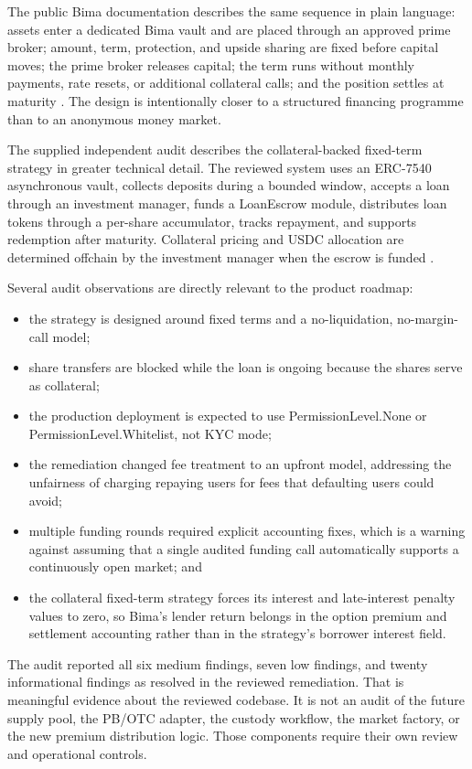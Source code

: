 \documentclass[11pt,oneside]{article}
\begin{document}
The public Bima documentation describes the same sequence in plain language: assets enter a dedicated Bima vault and are placed through an approved prime broker; amount, term, protection, and upside sharing are fixed before capital moves; the prime broker releases capital; the term runs without monthly payments, rate resets, or additional collateral calls; and the position settles at maturity \cite{bima-docs}. The design is intentionally closer to a structured financing programme than to an anonymous money market.

The supplied independent audit describes the collateral-backed fixed-term strategy in greater technical detail. The reviewed system uses an ERC-7540 asynchronous vault, collects deposits during a bounded window, accepts a loan through an investment manager, funds a LoanEscrow module, distributes loan tokens through a per-share accumulator, tracks repayment, and supports redemption after maturity. Collateral pricing and USDC allocation are determined offchain by the investment manager when the escrow is funded \cite{strategy-audit}.

Several audit observations are directly relevant to the product roadmap:

\begin{itemize}
\item the strategy is designed around fixed terms and a no-liquidation, no-margin-call model;
\item share transfers are blocked while the loan is ongoing because the shares serve as collateral;
\item the production deployment is expected to use PermissionLevel.None or PermissionLevel.Whitelist, not KYC mode;
\item the remediation changed fee treatment to an upfront model, addressing the unfairness of charging repaying users for fees that defaulting users could avoid;
\item multiple funding rounds required explicit accounting fixes, which is a warning against assuming that a single audited funding call automatically supports a continuously open market; and
\item the collateral fixed-term strategy forces its interest and late-interest penalty values to zero, so Bima's lender return belongs in the option premium and settlement accounting rather than in the strategy's borrower interest field.
\end{itemize}

The audit reported all six medium findings, seven low findings, and twenty informational findings as resolved in the reviewed remediation. That is meaningful evidence about the reviewed codebase. It is not an audit of the future supply pool, the PB/OTC adapter, the custody workflow, the market factory, or the new premium distribution logic. Those components require their own review and operational controls.
\end{document}
